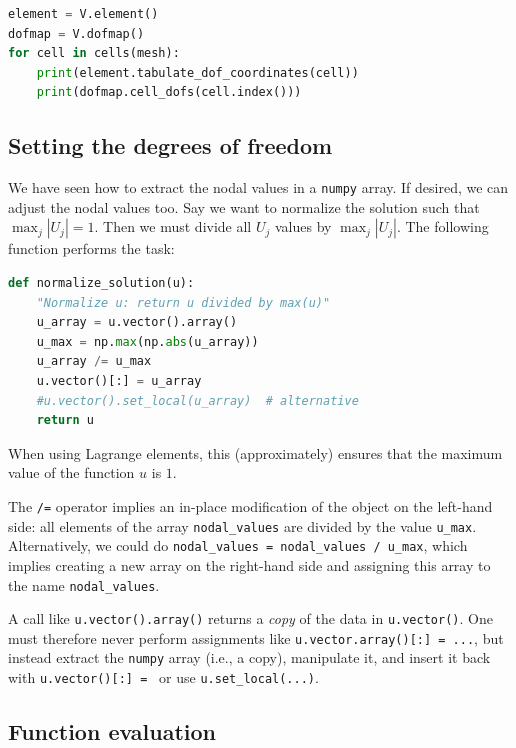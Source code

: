 \documentclass[graybox,envcountchap,sectrefs,final]{svmonodo}
\newenvironment{warning_mdfboxadmon}[1][]{
\begin{warning_mdfboxmdframed}[frametitle=#1]
}
{
\end{warning_mdfboxmdframed}
}
\begin{document}
\begin{lstlisting}[language=Python,style=graycolor]
element = V.element()
dofmap = V.dofmap()
for cell in cells(mesh):
    print(element.tabulate_dof_coordinates(cell))
    print(dofmap.cell_dofs(cell.index()))
\end{lstlisting}

\subsection{Setting the degrees of freedom}

We have seen how to extract the nodal values in a \texttt{numpy} array.
If desired, we can adjust the nodal values too. Say we want to
normalize the solution such that $\max_j |U_j| = 1$. Then we
must divide all $U_j$ values
by $\max_j |U_j|$. The following function performs the task:

\begin{lstlisting}[language=Python,style=graycolor]
def normalize_solution(u):
    "Normalize u: return u divided by max(u)"
    u_array = u.vector().array()
    u_max = np.max(np.abs(u_array))
    u_array /= u_max
    u.vector()[:] = u_array
    #u.vector().set_local(u_array)  # alternative
    return u
\end{lstlisting}
When using Lagrange elements, this (approximately) ensures that the
maximum value of the function $u$ is $1$.

The \texttt{/=} operator implies an
in-place modification of the object on the left-hand side: all
elements of the array \Verb!nodal_values! are divided by the value \Verb!u_max!.
Alternatively, we could do \Verb!nodal_values = nodal_values / u_max!, which
implies creating a new array on the right-hand side and assigning this
array to the name \Verb!nodal_values!.


\begin{warning_mdfboxadmon}
A call like \texttt{u.vector().array()} returns a \emph{copy} of the data in
\texttt{u.vector()}. One must therefore never perform assignments like
\texttt{u.vector.array()[:] = ...}, but instead extract the \texttt{numpy} array
(i.e., a copy), manipulate it, and insert it back with \texttt{u.vector()[:] = } or use \Verb!u.set_local(...)!.
\end{warning_mdfboxadmon} %



\subsection{Function evaluation}
\end{document}
